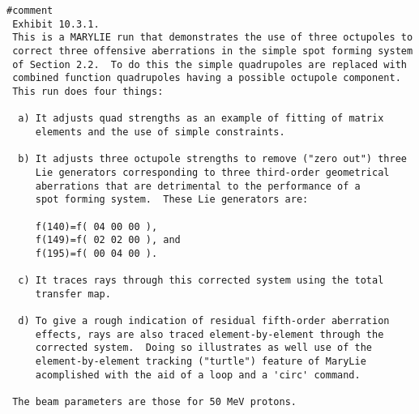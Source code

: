 \begin{footnotesize}
\begin{verbatim}
#comment
 Exhibit 10.3.1.
 This is a MARYLIE run that demonstrates the use of three octupoles to
 correct three offensive aberrations in the simple spot forming system
 of Section 2.2.  To do this the simple quadrupoles are replaced with
 combined function quadrupoles having a possible octupole component.
 This run does four things:

  a) It adjusts quad strengths as an example of fitting of matrix
     elements and the use of simple constraints.

  b) It adjusts three octupole strengths to remove ("zero out") three
     Lie generators corresponding to three third-order geometrical
     aberrations that are detrimental to the performance of a
     spot forming system.  These Lie generators are:

     f(140)=f( 04 00 00 ),
     f(149)=f( 02 02 00 ), and
     f(195)=f( 00 04 00 ).

  c) It traces rays through this corrected system using the total
     transfer map.

  d) To give a rough indication of residual fifth-order aberration
     effects, rays are also traced element-by-element through the
     corrected system.  Doing so illustrates as well use of the
     element-by-element tracking ("turtle") feature of MaryLie
     acomplished with the aid of a loop and a 'circ' command.

 The beam parameters are those for 50 MeV protons.


\end{verbatim}
\end{footnotesize}

